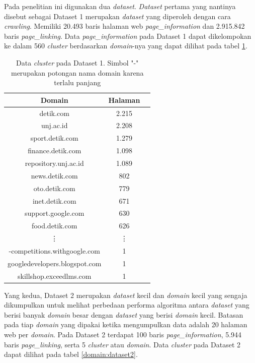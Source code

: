 \documentclass[
	a4paper, %
	12pt, %
	unnumberedsections, %
	twoside, %
]{LTJournalArticle}
\begin{document}
Pada penelitian ini digunakan dua \textit{dataset}. \textit{Dataset} pertama yang nantinya disebut sebagai Dataset 1 merupakan \textit{dataset} yang diperoleh dengan cara \textit{crawling}. Memiliki 20.493 baris halaman web \textit{page\_information} dan 2.915.842 baris \textit{page\_linking}. Data \textit{page\_information} pada Dataset 1 dapat dikelompokan ke dalam 560 \textit{cluster} berdasarkan \textit{domain}-nya yang dapat dilihat pada tabel \ref{domain:dataset1}.

\begin{table}
	\centering
	\caption{Data \textit{cluster} pada Dataset 1. Simbol "-" merupakan potongan nama domain karena terlalu panjang}
	\label{domain:dataset1}
	\begin{tabular}{|c|c|c|}
	\hline
	\textbf{Domain} & \textbf{Halaman} \\
	\hline
	detik.com & 2.215 \\
	unj.ac.id & 2.208 \\
	sport.detik.com & 1.279 \\
	finance.detik.com & 1.098 \\
	repository.unj.ac.id & 1.089 \\
	news.detik.com & 802 \\
	oto.detik.com & 779 \\
	inet.detik.com & 671 \\
	support.google.com & 630 \\
	food.detik.com & 626 \\
	\vdots & \vdots \\
	-competitions.withgoogle.com & 1 \\
	googledevelopers.blogspot.com & 1 \\
	skillshop.exceedlms.com & 1 \\
	\hline
	\end{tabular}
\end{table}

Yang kedua, Dataset 2 merupakan \textit{dataset} kecil dan \textit{domain} kecil yang sengaja dikumpulkan untuk melihat perbedaan performa algoritma antara \textit{dataset} yang berisi banyak \textit{domain} besar dengan \textit{dataset} yang berisi \textit{domain} kecil. Batasan pada tiap \textit{domain} yang dipakai ketika mengumpulkan data adalah 20 halaman web per \textit{domain}. Pada Dataset 2 terdapat 100 baris \textit{page\_information}, 5.944 baris \textit{page\_linking}, serta 5 \textit{cluster} atau \textit{domain}. Data \textit{cluster} pada Dataset 2 dapat dilihat pada tabel \ref{domain:dataset2}.
\end{document}
